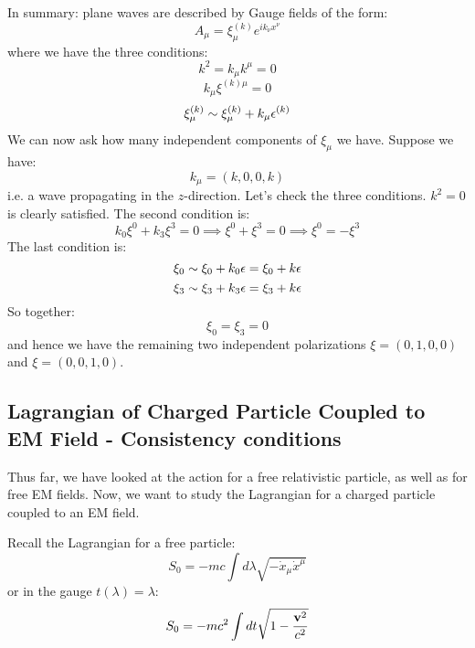 In summary: plane waves are described by Gauge fields of the form:
\begin{equation}
    A_\mu = \xi_\mu^{(k)}e^{ik_\nu x^\nu}
\end{equation}
where we have the three conditions:
\begin{equation}
    k^2 = k_\mu k^\mu = 0
\end{equation}
\begin{equation}
    k_\mu \xi^{(k)\mu} = 0
\end{equation}
\begin{equation}
    \xi_\mu^{(k)} \sim \xi_\mu^{(k)} + k_\mu \epsilon^{(k)}
\end{equation}
We can now ask how many independent components of $\xi_\mu$ we have. Suppose we have:
\begin{equation}
    k_\mu = (k, 0, 0, k)
\end{equation}
i.e. a wave propagating in the $z$-direction. Let's check the three conditions. $k^2 = 0$ is clearly satisfied. The second condition is:
\begin{equation}
    k_0\xi^0 + k_3 \xi^3 = 0 \implies \xi^0 + \xi^3 = 0 \implies \xi^0 = -\xi^3
\end{equation}
The last condition is:
\begin{equation}
    \xi_0 \sim \xi_0 + k_0 \epsilon = \xi_0 + k\epsilon
\end{equation}
\begin{equation}
    \xi_3 \sim \xi_3 + k_3 \epsilon = \xi_3 + k\epsilon
\end{equation}
So together:
\begin{equation}
    \xi_0 = \xi_3 = 0
\end{equation}
and hence we have the remaining two independent polarizations $\xi = (0, 1, 0, 0)$ and $\xi = (0, 0, 1, 0)$.

\subsection{Lagrangian of Charged Particle Coupled to EM Field - Consistency conditions}
Thus far, we have looked at the action for a free relativistic particle, as well as for free EM fields. Now, we want to study the Lagrangian for a charged particle coupled to an EM field.

Recall the Lagrangian for a free particle:
\begin{equation}
    S_0 = -mc\int d\lambda \sqrt{-\dot{x}_\mu \dot{x}^\mu}
\end{equation}
or in the gauge $t(\lambda) = \lambda$:
\begin{equation}
    S_0 = -mc^2 \int dt\sqrt{1-\frac{\mathbf{v}^2}{c^2}}
\end{equation}

